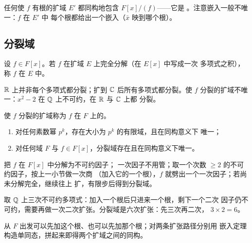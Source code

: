 \begin{remark}[意义]
任何使 $f$ 有根的扩域 $E'$ 都同构地包含 $F[x]/(f)$——它是
。注意嵌入一般不唯一：$f$ 在 $E'$ 中
每个根都给出一个嵌入（$\bar x$ 映到哪个根）。
\end{remark}

\subsection{分裂域}

\begin{definition}[分裂（Split）]
设 $f\in F[x]$。若 $f$ 在扩域 $E$ 上完全分解（在 $E[x]$ 中写成一次
多项式之积），称 $f$ 在 $E$ 中。
\end{definition}

\begin{example}
$\mathbb{R}$ 上并非每个多项式都分裂；扩到 $\mathbb{C}$ 后所有多项式都分裂。使 $f$
分裂的扩域不唯一：$x^2 - 2$ 在 $\mathbb{Q}$ 上不可约，在 $\mathbb{R}$ 与 $\mathbb{C}$ 上都
分裂。
\end{example}

\begin{definition}
使 $f$ 分裂的扩域称为 $f$ 在 $F$ 上的。
\end{definition}

\begin{enumerate}[leftmargin=1.6em,itemsep=2pt]
  \item 对任何素数幂 $p^k$，存在大小为 $p^k$ 的有限域，且在同构意义下
        唯一；
  \item 对任何域 $F$ 与 $f\in F[x]$，分裂域存在且在同构意义下唯一。
\end{enumerate}

\begin{strand}
把 $f$ 在 $F[x]$ 中分解为不可约因子；
一次因子不用管；取一个次数 $\ge 2$ 的不可约因子，按上一小节做一次商
（加入它的一个根），$f$ 就劈出一个一次因子；若尚未分解完全，继续往上
扩，有限步后得到分裂域。
\end{strand}

\begin{example}[一次取商一般得不到分裂域]
取 $\mathbb{Q}$ 上三次不可约多项式：加入一个根后只进来一个根，剩下一个二次
因子仍不可约，需要再做一次二次扩张。分裂域是六次扩张：先三次再二次，
$3\times 2 = 6$。
\end{example}

\begin{remark}[扩张顺序不影响结果]
从 $F$ 出发可以先加这个根、也可以先加那个根；对两条扩张路径分别用
嵌入定理构造单同态，拼起来即得两个扩域之间的同构。
\end{remark}
